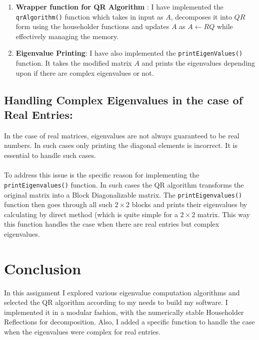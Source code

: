 \documentclass{article}
\begin{document}
\begin{enumerate}
\begin{itemize}
    \end{itemize}
    \item \textbf{Wrapper function for QR Algorithm} : I have implemented the \texttt{qrAlgorithm()} function which takes in input as $A$, decomposes it into $QR$ form using the householder functions and updates $A$ as $A \leftarrow R Q$ while effectively managing the memory.
    \item \textbf{Eigenvalue Printing}: I have also implemented the \texttt{printEigenValues()} function. It takes the modified matrix $A$ and prints the eigenvalues depending upon if there are complex eigenvalues or not.
\end{enumerate}

\subsection{Handling Complex Eigenvalues in the case of Real Entries:} \cite{libretexts}
In the case of real matrices, eigenvalues are not always guaranteed to be real numbers. In such cases only printing the diagonal elements is incorrect. It is essential to handle such cases.
\paragraph{} To address this issue is the specific reason for implementing the \texttt{printEigenvalues()} function. In such cases the QR algorithm transforms the original matrix into a Block Diagonalizable matrix. The \texttt{printEigenvalues()} function then goes through all such $2\times2$ blocks and prints their eigenvalues by calculating by direct method (which is quite simple for a $2\times2$ matrix. This way this function handles the case when there are real entries but complex eigenvalues.

\section{Conclusion}
In this assignment I explored various eigenvalue computation algorithms and selected the QR algorithm according to my needs to build my software. I implemented it in a modular fashion, with the numerically stable Householder Reflections for decomposition. Also, I added a specific function to handle the case when the eigenvalues were complex for real entries. 




\end{document}
